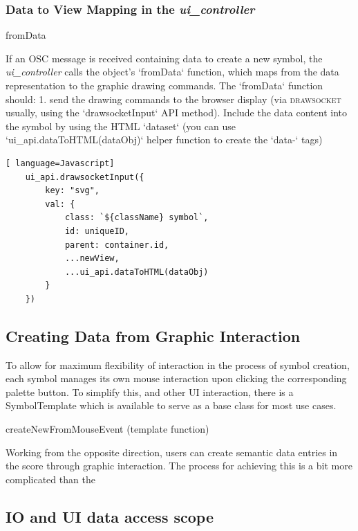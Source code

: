 \documentclass{article}
\def\drawsocket{\textsc{drawsocket}\xspace}
\def\uicontroller{\textit{ui\_controller}\xspace}
\begin{document}

\subsubsection{Data to View Mapping in the \uicontroller}

fromData

If an OSC message is received containing data to create a new symbol, the \uicontroller calls the object's `fromData` function, which maps from the data representation to the graphic drawing commands. The `fromData` function should:
1. send the drawing commands to the browser display (via \drawsocket usually, using the `drawsocketInput` API method). Include the data content into the symbol by using the HTML `dataset` (you can use `ui\_api.dataToHTML(dataObj)` helper function to create the `data-` tags)

\begin{lstlisting}[ language=Javascript]
    ui_api.drawsocketInput({
        key: "svg",
        val: {
            class: `${className} symbol`,
            id: uniqueID,
            parent: container.id,
            ...newView, 
            ...ui_api.dataToHTML(dataObj)
        }
    }) 
\end{lstlisting}

\subsection{Creating Data from Graphic Interaction}

To allow for maximum flexibility of interaction in the process of symbol creation, each symbol manages its own mouse interaction upon clicking the corresponding palette button. To simplify this, and other UI interaction, there is a SymbolTemplate which is available to serve as a base class for most use cases. 

 

createNewFromMouseEvent (template function)

Working from the opposite direction, users can create semantic data entries in the score through graphic interaction. The process for achieving this is a bit more complicated than the 


\subsection*{IO and UI data access scope}\label{sec:io_ui_elements}
\end{document}
